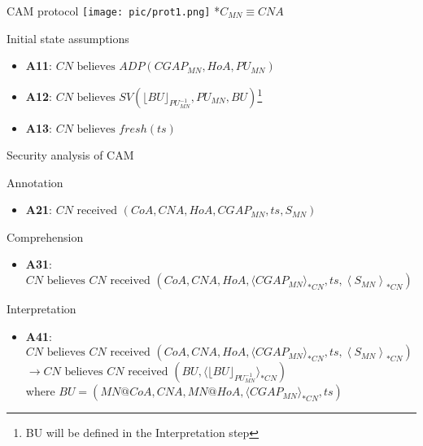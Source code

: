 \documentclass[10pt]{beamer}
\newcommand{\xtext}[1]{\text{ #1 }}
\begin{document}
\begin{frame}{CAM protocol}
	\centering \texttt{[image: pic/prot1.png]}
	*$C_{MN} \equiv CNA$
	\begin{block}{Initial state assumptions}
		\begin{itemize}
			\item \textbf{A11}: $CN \xtext{believes} ADP(CGAP_{MN}, HoA, PU_{MN})$
			\item \textbf{A12}: $CN \xtext{believes} SV(\lfloor BU\rfloor_{PU_{MN}^{-1}}, PU_{MN}, BU)$\footnote{BU will be defined in the Interpretation step}
			\item \textbf{A13}: $CN \xtext{believes} fresh(ts)$
		\end{itemize}
	\end{block}
\end{frame}
\begin{frame}{Security analysis of CAM}
	\begin{block}{Annotation}
		\begin{itemize}
			\item \textbf{A21}: $CN \xtext{received} (CoA, CNA, HoA, CGAP_{MN}, ts, S_{MN})$
		\end{itemize}
	\end{block}
	\begin{block}{Comprehension}
		\begin{itemize}
			\item \textbf{A31}: {\small $CN \xtext{believes} CN \xtext{received} (CoA, CNA,HoA,\langle CGAP_{MN}\rangle_{*CN},ts, \left\langle S_{MN}\right\rangle_{*CN})$}
		\end{itemize}
	\end{block}
	\begin{block}{Interpretation}
		\begin{itemize}
			\item \textbf{A41}: {\small $CN \xtext{believes} CN \xtext{received} (CoA, CNA,HoA,\langle CGAP_{MN}\rangle_{*CN},ts, \left\langle S_{MN}\right\rangle_{*CN})$ \\ 
			$\rightarrow CN \xtext{believes} CN \xtext{received} (BU, \langle\lfloor BU\rfloor_{PU_{MN}^{-1}}\rangle_{*CN})$} \\ where $BU = (MN@CoA, CNA, MN@HoA, \langle CGAP_{MN}\rangle_{*CN}, ts)$
		\end{itemize}
	\end{block}
\end{frame}
\end{document}
